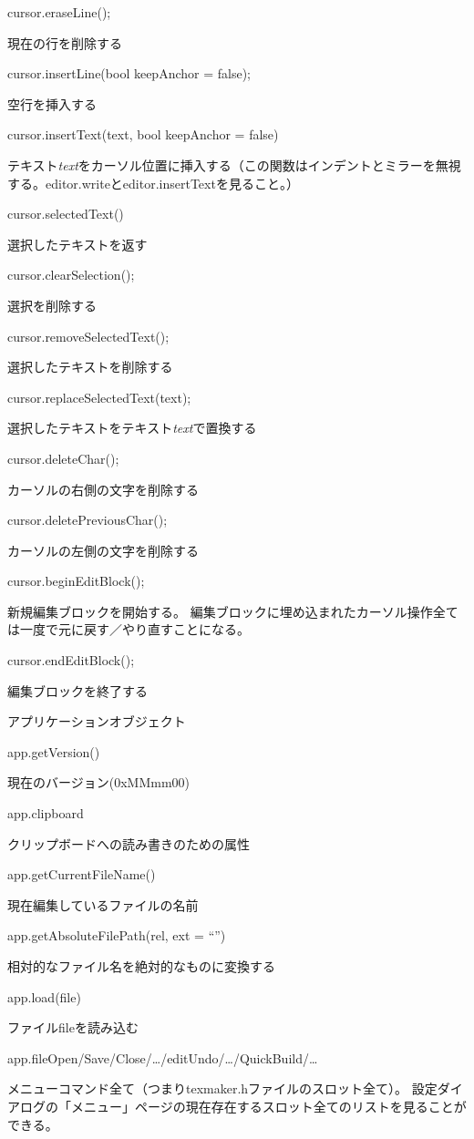 \documentclass[]{book}
\begin{document}
cursor.eraseLine();

現在の行を削除する

cursor.insertLine(bool keepAnchor = false);

空行を挿入する

cursor.insertText(text, bool keepAnchor = false)

テキスト\emph{text}をカーソル位置に挿入する（この関数はインデントとミラーを無視する。editor.writeとeditor.insertTextを見ること。）

cursor.selectedText()

選択したテキストを返す

cursor.clearSelection();

選択を削除する

cursor.removeSelectedText();

選択したテキストを削除する

cursor.replaceSelectedText(text);

選択したテキストをテキスト\emph{text}で置換する

cursor.deleteChar();

カーソルの右側の文字を削除する

cursor.deletePreviousChar();

カーソルの左側の文字を削除する

cursor.beginEditBlock();

新規編集ブロックを開始する。
編集ブロックに埋め込まれたカーソル操作全ては一度で元に戻す／やり直すことになる。

cursor.endEditBlock();

編集ブロックを終了する

アプリケーションオブジェクト

app.getVersion()

現在のバージョン(0xMMmm00)

app.clipboard

クリップボードへの読み書きのための属性

app.getCurrentFileName()

現在編集しているファイルの名前

app.getAbsoluteFilePath(rel, ext = ``'')

相対的なファイル名を絶対的なものに変換する

app.load(file)

ファイルfileを読み込む

app.fileOpen/Save/Close/\ldots{}/editUndo/\ldots{}/QuickBuild/\ldots{}

メニューコマンド全て（つまりtexmaker.hファイルのスロット全て）。
設定ダイアログの「メニュー」ページの現在存在するスロット全てのリストを見ることができる。
\end{document}

